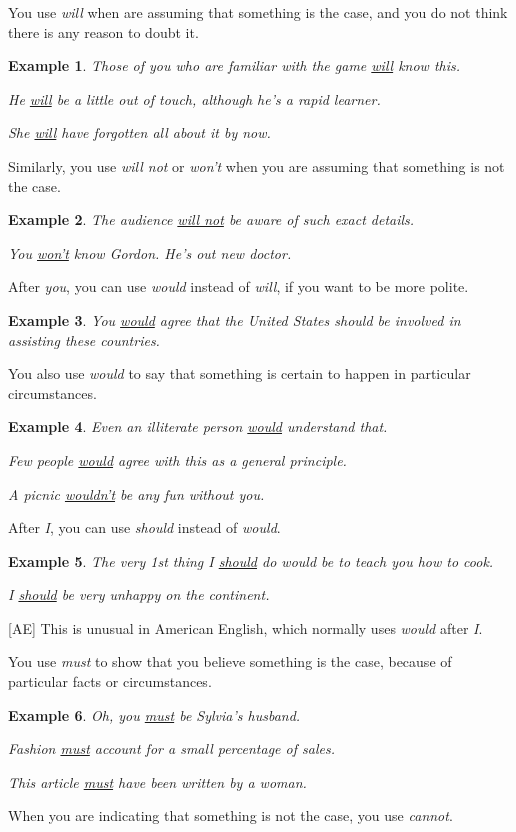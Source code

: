 \documentclass[oneside]{book}
\numberwithin{equation}{section}
\newtheorem{example}{Example}[section]
\begin{document}
%
\noindent{} You use \textit{will} when are assuming that something is the case, and you do not think there is any reason to doubt it.
\begin{example}
    Those of you who are familiar with the game \underline{will} know this.
    
    He \underline{will} be a little out of touch, although he's a rapid learner.
    
    She \underline{will} have forgotten all about it by now.
\end{example}
Similarly, you use \textit{will not} or \textit{won't} when you are assuming that something is not the case.
\begin{example}
    The audience \underline{will not} be aware of such exact details.
    
    You \underline{won't} know Gordon. He's out new doctor.
\end{example}
After \textit{you}, you can use \textit{would} instead of \textit{will}, if you want to be more polite.
\begin{example}
    You \underline{would} agree that the United States should be involved in assisting these countries.
\end{example}
%
\noindent{} You also use \textit{would} to say that something is certain to happen in particular circumstances.
\begin{example}
    Even an illiterate person \underline{would} understand that.
    
    Few people \underline{would} agree with this as a general principle.
    
    A picnic \underline{wouldn't} be any fun without you.
\end{example}
After \textit{I}, you can use \textit{should} instead of \textit{would}.
\begin{example}
    The very 1st thing I \underline{should} do would be to teach you how to cook.
    
    I \underline{should} be very unhappy on the continent.
\end{example}
[AE] This is unusual in American English, which normally uses \textit{would} after \textit{I}.

%
\noindent{} You use \textit{must} to show that you believe something is the case, because of particular facts or circumstances.
\begin{example}
    Oh, you \underline{must} be Sylvia's husband.
    
    Fashion \underline{must} account for a small percentage of sales.
    
    This article \underline{must} have been written by a woman.
\end{example}
When you are indicating that something is not the case, you use \textit{cannot}.
\end{document}
